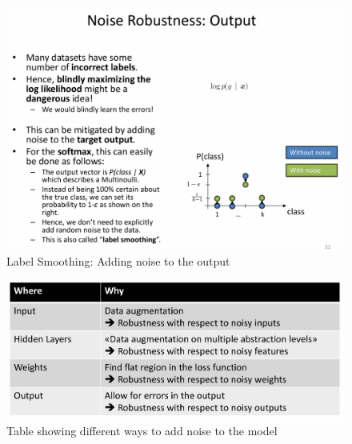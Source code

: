 \documentclass[../Main.tex]{subfiles}
\begin{document}

\begin{figure}[H]
    \centering
    \includegraphics[width=0.75\linewidth]{Images/deepl/label-smoothing.png}
    \caption{Label Smoothing: Adding noise to the output}
\end{figure}


\begin{figure}[H]
    \centering
    \includegraphics[width=0.75\linewidth]{Images/deepl/robustness-noise.png}
    \caption{Table showing different ways to add noise to the model}
\end{figure}
\end{document}
